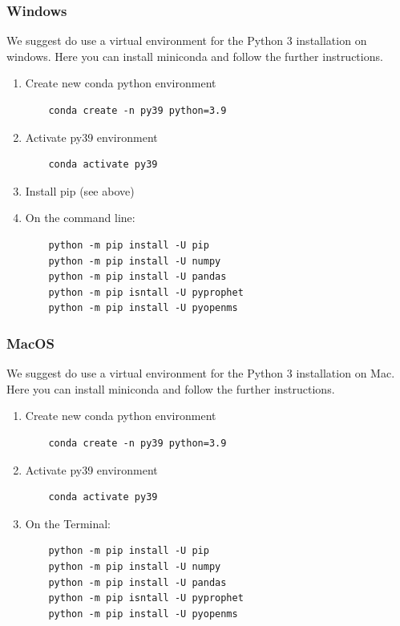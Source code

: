 \subsubsection{Windows}
We suggest do use a virtual environment for the Python 3 installation on windows. 
Here you can install miniconda and follow the further instructions. \\

\begin{enumerate}
  \item Create new conda python environment
    \begin{lstlisting}
    conda create -n py39 python=3.9
    \end{lstlisting} 
  \item Activate py39 environment
    \begin{lstlisting}
    conda activate py39
    \end{lstlisting} 
  \item Install pip (see above)
  \item On the command line:
    \begin{lstlisting}
    python -m pip install -U pip
    python -m pip install -U numpy
    python -m pip install -U pandas
    python -m pip isntall -U pyprophet
    python -m pip install -U pyopenms
    \end{lstlisting}
\end{enumerate}

\subsubsection{MacOS}
We suggest do use a virtual environment for the Python 3 installation on Mac. 
Here you can install miniconda and follow the further instructions. \\

\begin{enumerate}
  \item Create new conda python environment
    \begin{lstlisting}
    conda create -n py39 python=3.9
    \end{lstlisting} 
    \item Activate py39 environment
    \begin{lstlisting}
    conda activate py39
    \end{lstlisting} 
  \item On the Terminal:
    \begin{lstlisting}
    python -m pip install -U pip
    python -m pip install -U numpy
    python -m pip install -U pandas
    python -m pip isntall -U pyprophet
    python -m pip install -U pyopenms
    \end{lstlisting}
\end{enumerate}


